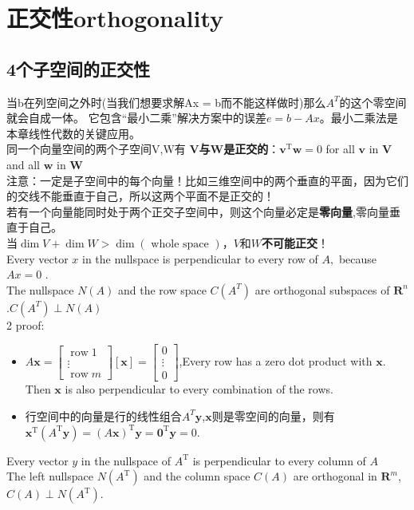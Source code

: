     \section{正交性orthogonality}
    \subsection{4个子空间的正交性}
    当b在列空间之外时(当我们想要求解Ax = b而不能这样做时)那么$A^T$的这个零空间就会自成一体。 它包含“最小二乘”解决方案中的误差$e = b-Ax$。最小二乘法是本章线性代数的关键应用。
    \\
    同一个向量空间的两个子空间V,W有 \textbf{V与W是正交的}：$\boldsymbol{v}^{\mathrm{T}} \boldsymbol{w}=0$ for all $\boldsymbol{v}$ in $\boldsymbol{V}$ and all $\boldsymbol{w}$ in $\boldsymbol{W}$
    \\
    注意：一定是子空间中的每个向量！比如三维空间中的两个垂直的平面，因为它们的交线不能垂直于自己，所以这两个平面不是正交的！
    \\
    若有一个向量能同时处于两个正交子空间中，则这个向量必定是\textbf{零向量},零向量垂直于自己。\\
    当$\operatorname{dim} V+\operatorname{dim} W>\operatorname{dim}(\text { whole space })$，$V$和$W$\textbf{不可能正交}！
    \\
    Every vector $x$ in the nullspace is perpendicular to every row of $A,$ because $A x=0$ .\\
    The nullspace $N(A)$ and the row space $C\left(A^{T}\right)$ are orthogonal subspaces of $\mathbf{R}^{n}$ .$C(A^T) \perp N\left(A \right)$
    \\
    2 proof:
    \begin{itemize}
        \item $A \boldsymbol{x}=\left[\begin{array}{c}{\operatorname{row} 1} \\ {\vdots} \\ {\operatorname{row} m}\end{array}\right][\boldsymbol{x}]=\left[\begin{array}{c}{0} \\ {\vdots} \\ {0}\end{array}\right]$,Every row has a zero dot product with $\bm{x}$. Then $\bm{x}$ is also perpendicular
to every combination of the rows.
        \item 行空间中的向量是行的线性组合$A^T\bm{y}$,\quad $\bm{x}$则是零空间的向量，则有$\boldsymbol{x}^{\mathrm{T}}\left(A^{\mathrm{T}} \boldsymbol{y}\right)=(A \boldsymbol{x})^{\mathrm{T}} \boldsymbol{y}=\mathbf{0}^{\mathrm{T}} \boldsymbol{y}=0$.
    \end{itemize}
    Every vector $y$ in the nullspace of $A^{\mathrm{T}}$ is perpendicular to every column of $A$\\
    The left nullspace $N\left(A^{\mathrm{T}}\right)$ and the column space $C(A)$ are orthogonal in $\mathbf{R}^{m}$, $C(A) \perp N\left(A^{\mathrm{T}}\right)$.
    \\
